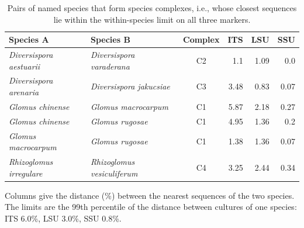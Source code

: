 \begin{table}[htbp]\centering
\begin{threeparttable}
\caption{Pairs of named species that form species complexes, i.e., whose closest sequences lie within the within-species limit on all three markers.}
\label{tab:complexes}
\footnotesize\setlength{\tabcolsep}{4pt}
\begin{tabular}{llcrrr}
\toprule
Species A & Species B & Complex & ITS & LSU & SSU\\
\midrule
\emph{Diversispora aestuarii} & \emph{Diversispora varaderana} & C2 & 1.1 & 1.09 & 0.0\\
\emph{Diversispora arenaria} & \emph{Diversispora jakucsiae} & C3 & 3.48 & 0.83 & 0.07\\
\emph{Glomus chinense} & \emph{Glomus macrocarpum} & C1 & 5.87 & 2.18 & 0.27\\
\emph{Glomus chinense} & \emph{Glomus rugosae} & C1 & 4.95 & 1.36 & 0.2\\
\emph{Glomus macrocarpum} & \emph{Glomus rugosae} & C1 & 1.38 & 1.36 & 0.07\\
\emph{Rhizoglomus irregulare} & \emph{Rhizoglomus vesiculiferum} & C4 & 3.25 & 2.44 & 0.34\\
\bottomrule
\end{tabular}
\begin{tablenotes}\footnotesize
\item Columns give the distance (\%) between the nearest sequences of the two species. The limits are the 99th
percentile of the distance between cultures of one species: ITS 6.0\%, LSU 3.0\%, SSU 0.8\%.
\end{tablenotes}
\end{threeparttable}
\end{table}
